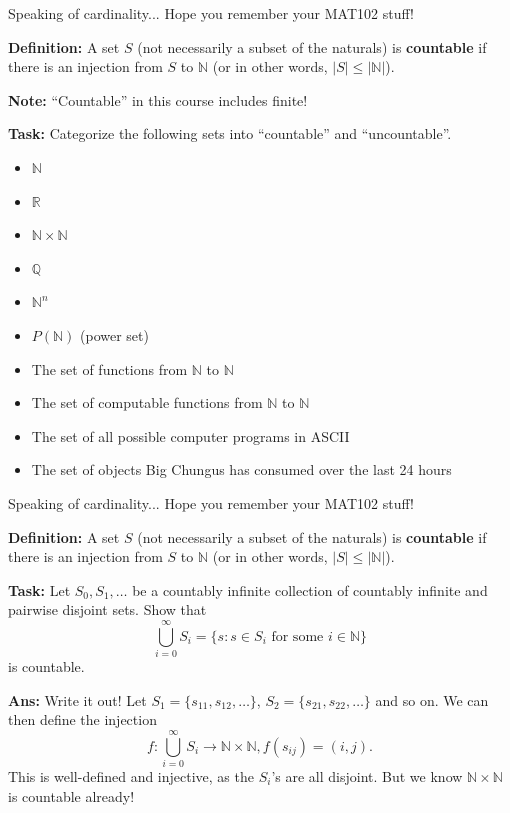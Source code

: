 \documentclass{beamer}
\newcommand{\N}{{\mathbb N}}
\newcommand{\R}{{\mathbb R}}
\begin{document}
\begin{frame}{Speaking of cardinality...}
Hope you remember your MAT102 stuff!

\pause

\textbf{Definition:} A set $S$ (not necessarily a subset of the naturals) is \textbf{countable} if there is an injection from $S$ to $\N$ (or in other words, $|S| \leq |\N|$).

\pause

\textbf{Note:} ``Countable'' in this course includes finite!

\textbf{Task:} Categorize the following sets into ``countable'' and ``uncountable''.

\begin{minipage}{0.3\textwidth}
\begin{itemize}
    \item $\N$
    \item $\R$
    \item $\N \times \N$
    \item $\mathbb Q$
    \item $\N^n$
    \item $P(\N)$ (power set)
\end{itemize}
\end{minipage}
\begin{minipage}{0.6\textwidth}
\begin{itemize}
    \item The set of functions from $\N$ to $\N$
    \item The set of computable functions from $\N$ to $\N$
    \item The set of all possible computer programs in ASCII
    \item The set of objects Big Chungus has consumed over the last 24 hours
\end{itemize}
\end{minipage}
\end{frame}

\begin{frame}{Speaking of cardinality...}
Hope you remember your MAT102 stuff!

\pause

\textbf{Definition:} A set $S$ (not necessarily a subset of the naturals) is \textbf{countable} if there is an injection from $S$ to $\N$ (or in other words, $|S| \leq |\N|$).

\pause

\textbf{Task:} Let $S_0, S_1, \ldots$ be a countably infinite collection of countably infinite and pairwise disjoint sets. Show that
$$\bigcup_{i = 0}^\infty S_i = \{s: \text{$s \in S_i$ for some $i \in \N$}\}$$
is countable.

\textbf{Ans:} Write it out! Let $S_1 = \{s_{11}, s_{12}, \ldots\}$, $S_2 = \{s_{21}, s_{22}, \ldots\}$ and so on. We can then define the injection 
$$f: \bigcup_{i = 0}^\infty S_i \to \N \times \N, f(s_{ij}) = (i, j).$$
This is well-defined and injective, as the $S_i$'s are all disjoint. But we know $\N \times \N$ is countable already!
\end{frame}
\end{document}
